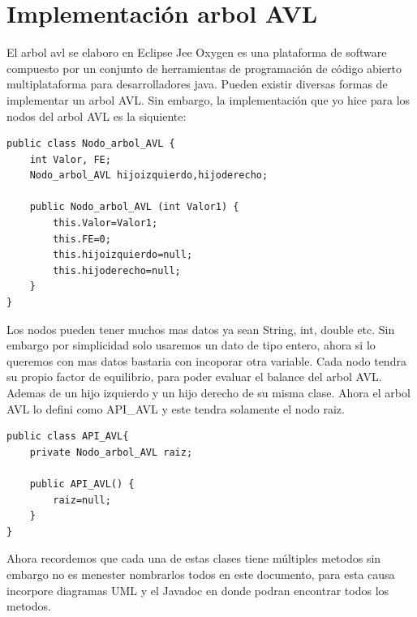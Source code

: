 \documentclass[12pt,letterpaper]{article}
\begin{document}
\section{Implementación arbol AVL}
El arbol avl se elaboro en Eclipse Jee Oxygen es una plataforma de software compuesto por un conjunto de herramientas de programación de código abierto multiplataforma para desarrolladores java.
\vskip 0.6cm
Pueden existir diversas formas de implementar un arbol AVL. Sin embargo, la implementación que yo hice para los nodos del arbol AVL es la siquiente:
\vskip 0.8cm
\begin{lstlisting}
public class Nodo_arbol_AVL {
	int Valor, FE;
	Nodo_arbol_AVL hijoizquierdo,hijoderecho;
	
	public Nodo_arbol_AVL (int Valor1) {
		this.Valor=Valor1;
		this.FE=0;
		this.hijoizquierdo=null;
		this.hijoderecho=null;
	}
}
\end{lstlisting}
\vskip 0.6cm
Los nodos pueden tener muchos mas datos ya sean String, int, double etc. Sin embargo por simplicidad solo usaremos un dato de tipo entero, ahora si lo queremos con mas datos bastaria con incoporar otra variable.
\vskip 0.6cm
Cada nodo tendra su propio factor de equilibrio, para poder evaluar el balance del arbol AVL. Ademas de un hijo izquierdo y un hijo derecho de su misma clase.
\vskip 0.8cm
Ahora el arbol AVL lo defini como API\_AVL y este tendra solamente el nodo raiz.
\begin{lstlisting}
public class API_AVL{
	private Nodo_arbol_AVL raiz;
	
	public API_AVL() {
		raiz=null;
	}
}
\end{lstlisting}
\vskip 0.8cm
Ahora recordemos que cada una de estas clases tiene múltiples metodos sin embargo no es menester nombrarlos todos en este documento, para esta causa incorpore diagramas UML y el Javadoc en donde podran encontrar todos los metodos.
\newpage
\begin{thebibliography}{10}
\end{thebibliography}
\end{document}
